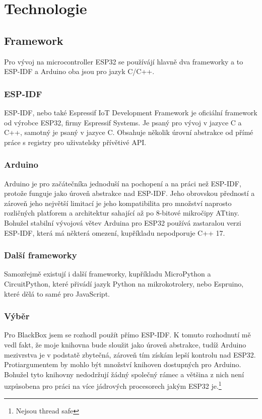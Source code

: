 \chapter{Technologie}

\section{Framework}

Pro vývoj na microcontroller ESP32 se používájí hlavně dva frameworky a to ESP-IDF\cite{ESP-IDF} a Arduino\cite{arduino} oba jsou pro jazyk C/C++.

\subsection{ESP-IDF}

ESP-IDF, nebo také Espressif IoT Development Framework je oficiální framework od výrobce ESP32, firmy Espressif Systems\cite{espressif}.
Je psaný pro vývoj v jazyce C a C++, samotný je psaný v jazyce C.
Obsahuje několik úrovní abstrakce od přímé práce s registry pro uživatelsky přívětivé API.





\subsection{Arduino}

Arduino je pro začátečníka jednoduší na pochopení a na práci než ESP-IDF, protože funguje jako úroveň abstrakce nad ESP-IDF.
Jeho obrovskou předností a zároveň jeho největší limitací je jeho kompatibilita pro množství naprosto rozličných platforem a architektur sahající až po 8-bitové mikročipy ATtiny. Bohužel stabilní vývojová větev Arduina pro ESP32 používá zastaralou verzi ESP-IDF, která má některá omezení, kupříkladu nepodporuje C++ 17.



\subsection{Další frameworky}

Samozřejmě existují i další frameworky, kupříkladu MicroPython\cite{uPython} a CircuitPython\cite{circuitPython}, které přivádí jazyk Python na mikrokotrolery, nebo Espruino\cite{espruino}, které dělá to samé pro JavaScript.

\subsection{Výběr}

Pro BlackBox jsem se rozhodl použít přímo ESP-IDF.
K tomuto rozhodnutí mě vedl fakt, že moje knihovna bude sloužit jako úroveň abstrakce, tudíž Arduino mezivrstva je v podstatě zbytečná, zároveň tím získám lepší kontrolu nad ESP32.
Protiargumentem by mohlo být množství knihoven dostupných pro Arduino.
Bohužel tyto knihovny nedodržují žádný společný rámec a většina z nich není uzpůsobena pro práci na více jádrových procesorech jakým ESP32 je.\footnote{Nejsou thread safe}

